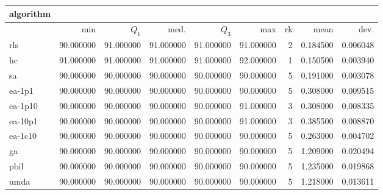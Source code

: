 \begin{tabular}{@{}l*{5}{>{{}}N{3}{0}}>{{}}N{2}{0}N{1}{3}N{1}{3}@{}}
\toprule
{algorithm} &  &  \\
\midrule
& {min} & {$Q_1$} & {med.} & {$Q_3$} & {max} & {rk} & {mean} & {dev.} \\
\midrule
rls & 90.000000 & {\color{blue}} 91.000000 & {\color{blue}} 91.000000 & {\color{blue}} 91.000000 & 91.000000 & 2 & 0.184500 & 0.006048 \\
 hc & {\color{blue}} 91.000000 & {\color{blue}} 91.000000 & {\color{blue}} 91.000000 & {\color{blue}} 91.000000 & {\color{blue}} 92.000000 & 1 & 0.150500 & 0.003940 \\
 sa & 90.000000 & 90.000000 & 90.000000 & 90.000000 & 90.000000 & 5 & 0.191000 & 0.003078 \\
 ea-1p1 & 90.000000 & 90.000000 & 90.000000 & 90.000000 & 90.000000 & 5 & 0.308000 & 0.009515 \\
 ea-1p10 & 90.000000 & 90.000000 & 90.000000 & 90.000000 & 91.000000 & 3 & 0.308000 & 0.008335 \\
 ea-10p1 & 90.000000 & 90.000000 & 90.000000 & 90.000000 & 91.000000 & 3 & 0.385500 & 0.008870 \\
 ea-1c10 & 90.000000 & 90.000000 & 90.000000 & 90.000000 & 90.000000 & 5 & 0.263000 & 0.004702 \\
 ga & 90.000000 & 90.000000 & 90.000000 & 90.000000 & 90.000000 & 5 & 1.209000 & 0.020494 \\
 pbil & 90.000000 & 90.000000 & 90.000000 & 90.000000 & 90.000000 & 5 & 1.235000 & 0.019868 \\
 umda & 90.000000 & 90.000000 & 90.000000 & 90.000000 & 90.000000 & 5 & 1.218000 & 0.013611 \\
 \bottomrule
\end{tabular}
